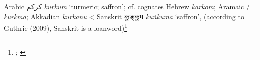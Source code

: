 \begin{etymology}\label{ety:kurkum}
Arabic {كركم} \textit{kurkum} `turmeric; saffron'; cf. cognates Hebrew  \textit{karkom}; Aramaic / \textit{kurkmā}; Akkadian  \textit{kurkanū}
< Sanskrit {कुङ्कुम } \textit{kuṅkuma} `saffron', (according to Guthrie (2009), Sanskrit is a loanword)\footnote{\textcite[s.v. kwrkm]{cal}; \textcite{guthrie_trade-language_2009}}
\end{etymology}